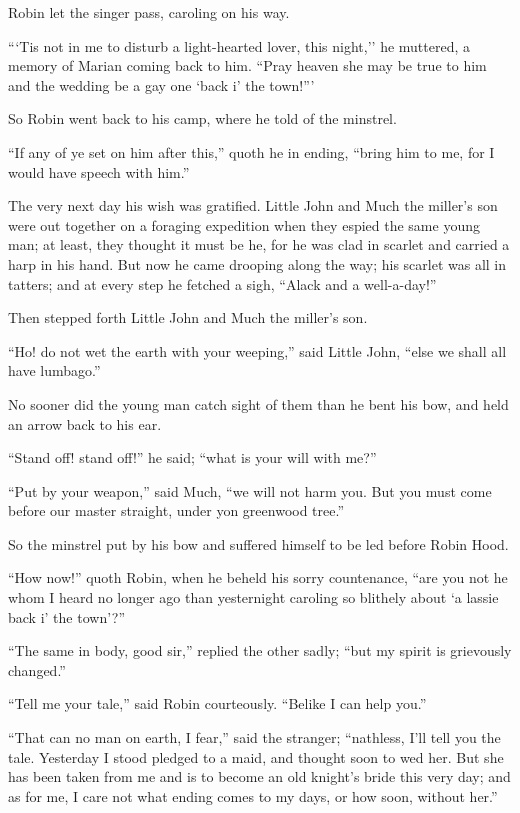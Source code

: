 Robin let the singer pass, caroling on his way.

```Tis not in me to disturb a light-hearted lover, this night,'' he
muttered, a memory of Marian coming back to him. ``Pray heaven she may
be true to him and the wedding be a gay one `back i' the town!'''

So Robin went back to his camp, where he told of the minstrel.

``If any of ye set on him after this,'' quoth he in ending, ``bring him
to me, for I would have speech with him.''

The very next day his wish was gratified. Little John and Much the
miller's son were out together on a foraging expedition when they espied
the same young man; at least, they thought it must be he, for he was
clad in scarlet and carried a harp in his hand. But now he came drooping
along the way; his scarlet was all in tatters; and at every step he
fetched a sigh, ``Alack and a well-a-day!''

Then stepped forth Little John and Much the miller's son.

``Ho! do not wet the earth with your weeping,'' said Little John, ``else
we shall all have lumbago.''

No sooner did the young man catch sight of them than he bent his bow,
and held an arrow back to his ear.

``Stand off! stand off!'' he said; ``what is your will with me?''

``Put by your weapon,'' said Much, ``we will not harm you. But you must
come before our master straight, under yon greenwood tree.''

So the minstrel put by his bow and suffered himself to be led before
Robin Hood.

``How now!'' quoth Robin, when he beheld his sorry countenance, ``are
you not he whom I heard no longer ago than yesternight caroling so
blithely about `a lassie back i' the town'?''

``The same in body, good sir,'' replied the other sadly; ``but my spirit
is grievously changed.''

``Tell me your tale,'' said Robin courteously. ``Belike I can help
you.''

``That can no man on earth, I fear,'' said the stranger; ``nathless,
I'll tell you the tale. Yesterday I stood pledged to a maid, and thought
soon to wed her. But she has been taken from me and is to become an old
knight's bride this very day; and as for me, I care not what ending
comes to my days, or how soon, without her.''

